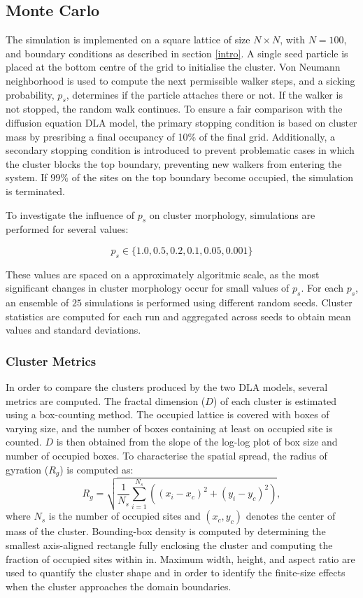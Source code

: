 \documentclass[10pt, journal]{IEEEtran}
\begin{document}
\subsection{Monte Carlo}

    The simulation is implemented on a square lattice of size $N \times N$, with $N=100$, and boundary conditions as described in section \ref{intro}.  A single seed particle is placed at the bottom centre of the grid to initialise the cluster. Von Neumann neighborhood is used to compute the next permissible walker steps, and a sicking probability, $p_{s}$, determines if the particle attaches there or not. If the walker is not stopped, the random walk continues. 
To ensure a fair comparison with the diffusion equation DLA model, the primary stopping condition is based on cluster mass by presribing a final occupancy of 10\% of the final grid. Additionally, a secondary stopping condition is introduced to prevent problematic cases in which the cluster blocks the top boundary, preventing new walkers from entering the system. If $99\%$ of the sites on the top boundary become occupied, the simulation is terminated. 

    To investigate the influence of $p_{s}$ on cluster morphology, simulations are performed for several values:

    \begin{equation}
        p_{s} \in \{1.0, 0.5, 0.2, 0.1, 0.05, 0.001\}
    \end{equation} 

    
    These values are spaced on a approximately algoritmic scale, as the most significant changes in cluster morphology occur for small values of $p_{s}$. For each $p_s$, an ensemble of $25$ simulations is performed using different random seeds. Cluster statistics are computed for each run and aggregated across seeds to obtain mean values and standard deviations.

    \subsubsection{Cluster Metrics}
        In order to compare the clusters produced by the two DLA models, several metrics are computed. The fractal dimension ($D$) of each cluster is estimated using a box-counting method. The occupied lattice is covered with boxes of varying size, and the number of boxes containing at least on occupied site is counted. $D$ is then obtained from the slope of the log-log plot of box size and number of occupied boxes. To characterise the spatial spread, the radius of gyration ($R_g$) is computed as:
        \begin{equation}
        R_g = \sqrt{\frac{1}{N_s} \sum_{i=1}^{N_s} \left( (x_i - x_c)^2 + (y_i - y_c)^2 \right)},
        \end{equation} 
        where $N_s$ is the number of occupied sites and $(x_c, y_c)$ denotes the center of mass of the cluster. Bounding-box density is computed by determining the smallest axis-aligned rectangle fully enclosing the cluster and computing the fraction of occupied sites within in. Maximum width, height, and aspect ratio are used to quantify the cluster shape and in order to identify the finite-size effects when the cluster approaches the domain boundaries. 
\end{document}
